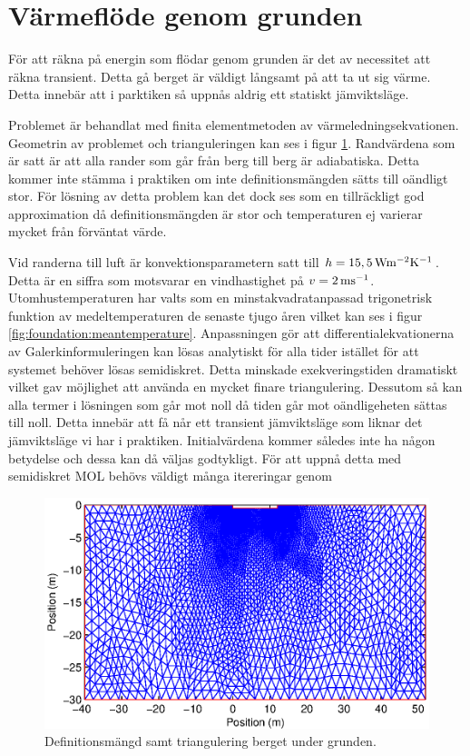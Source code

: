 \section{Värmeflöde genom grunden}

För att räkna på energin som flödar genom grunden är det av necessitet att räkna
transient. Detta gå berget är väldigt långsamt på att ta ut sig värme. Detta
innebär att i parktiken så uppnås aldrig ett statiskt jämviktsläge.

Problemet är behandlat med finita elementmetoden av värmeledningsekvationen.
Geometrin av problemet och trianguleringen kan ses i figur \ref{fig:foundation:tri}.
Randvärdena som är satt är att alla rander som går från berg till berg är adiabatiska.
Detta kommer inte stämma i praktiken om inte definitionsmängden sätts till oändligt
stor. För lösning av detta problem kan det dock ses som en tillräckligt god
approximation då definitionsmängden är stor och temperaturen ej varierar mycket
från förväntat värde.

Vid randerna till luft är konvektionsparametern satt
till $h = \unit[15,5]{Wm^{-2}K^{-1}}$. Detta är en siffra som motsvarar
en vindhastighet på $v = \unit[2]{ms^{-1}}$. Utomhustemperaturen har valts
som en minstakvadratanpassad trigonetrisk funktion av
medeltemperaturen de senaste tjugo åren vilket kan ses i figur
\ref{fig:foundation:meantemperature}. Anpassningen gör att
differentialekvationerna av Galerkinformuleringen kan lösas analytiskt
för alla tider istället för att systemet behöver lösas semidiskret.
Detta minskade exekveringstiden dramatiskt vilket gav möjlighet att använda en
mycket finare triangulering. Dessutom så kan alla termer i lösningen
som går mot noll då tiden går mot oändligeheten sättas till noll. Detta innebär
att få når ett transient jämviktsläge som liknar det jämviktsläge vi har i praktiken.
Initialvärdena kommer således inte ha någon betydelse och dessa kan då väljas
godtykligt. 
För att uppnå detta med semidiskret MOL behövs väldigt många itereringar genom

\begin{figure}
\centering
\includegraphics{images/trifoundation.eps}
\caption{Definitionsmängd samt triangulering berget under grunden.}
\label{fig:foundation:tri}
\end{figure}


